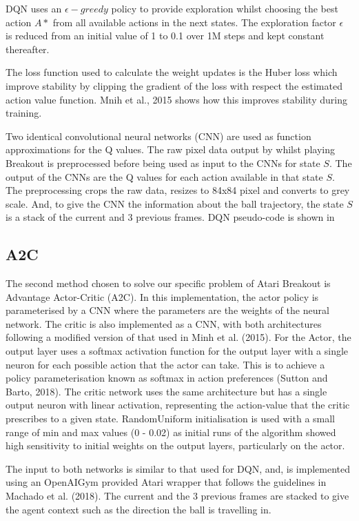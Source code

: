 \documentclass{article}
\begin{document}
DQN uses an $\epsilon-greedy$ policy to provide exploration whilst choosing the best action $A*$ from all available actions in the next states.
The exploration factor $\epsilon$ is reduced from an initial value of 1 to 0.1 over 1M steps and kept constant thereafter.

The loss function used to calculate the weight updates is the Huber loss which improve stability by clipping the gradient of the loss with respect the estimated action value function. Mnih et al., 2015 shows how this improves stability during training.

Two identical convolutional neural networks (CNN) are used as function approximations for the Q values. The raw pixel data output by  whilst playing Breakout is preprocessed before being used as input to the CNNs for state $S$. The output of the CNNs are the Q values for each action available in that state $S$.
The preprocessing crops the raw data, resizes to 84x84 pixel and converts to grey scale. And, to give the CNN the information about the ball trajectory, the state $S$ is a stack of the current and 3 previous frames.
DQN pseudo-code is shown in 

\subsection{A2C}

The second method chosen to solve our specific problem of Atari Breakout is Advantage Actor-Critic (A2C). In this implementation, the actor policy is parameterised by a CNN where the parameters are the weights of the neural network. The critic is also implemented as a CNN, with both architectures following a modified version of that used in Minh et al. (2015). For the Actor, the output layer uses a softmax activation function for the output layer with a single neuron for each possible action that the actor can take. This is to achieve a policy parameterisation known as softmax in action preferences (Sutton and Barto, 2018). The critic network uses the same architecture but has a single output neuron with linear activation, representing the action-value that the critic prescribes to a given state. RandomUniform initialisation is used with a small range of min and max values (0 - 0.02) as initial runs of the algorithm showed high sensitivity to initial weights on the output layers, particularly on the actor.

The input to both networks is similar to that used for DQN, and, is implemented using an OpenAIGym provided Atari wrapper that follows the guidelines in Machado et al. (2018). The current and the 3 previous frames are stacked to give the agent context such as the direction the ball is travelling in.
\end{document}
